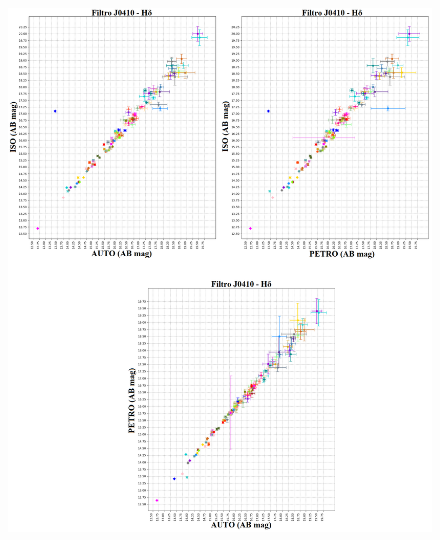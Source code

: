 \begin{anexosenv}
    \begin{figure}[h]
        \centering
        \includegraphics[width=1.0\textwidth]{Imagens/J0410_iso_auto.png}
        \caption[]{}
        \label{fig:J0410_iso_auto} 
    \end{figure}


\end{anexosenv}
